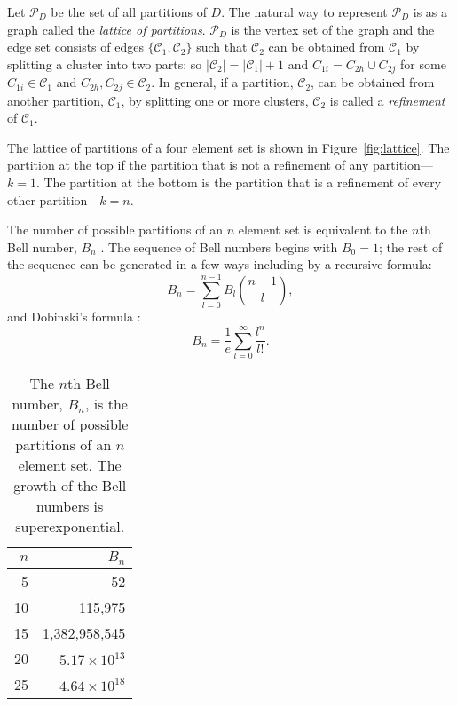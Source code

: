 \documentclass[a4paper]{report}
\newcommand{\dset}{D}
\newcommand{\clus}{\mathcal{C}}
\begin{document}
Let $\mathcal{P}_{D}$ be the set of all partitions of $\dset$.  The natural
way to represent $\mathcal{P}_{D}$ is as a graph called the \textit{lattice of
  partitions}.  $\mathcal{P}_{D}$ is the vertex set of the graph and the edge
set consists of edges $\{\clus_1,\clus_2\}$ such that $\clus_2$ can be
obtained from $\clus_1$ by splitting a cluster into two parts: so $|\clus_2| =
|\clus_1| + 1$ and $C_{1i} = C_{2h} \cup C_{2j}$ for some $C_{1i} \in \clus_1$
and $C_{2h},C_{2j} \in \clus_2$.  In general, if a partition, $\clus_2$, can
be obtained from another partition, $\clus_1$, by splitting one or more
clusters, $\clus_2$ is called a \textit{refinement} of $\clus_1$.

The lattice of partitions of a four element set is shown in
Figure~\ref{fig:lattice}.  The partition at the top if the partition that is
not a refinement of any partition---$k=1$.  The partition at the bottom is the
partition that is a refinement of every other partition---$k=n$.

The number of possible partitions of an $n$ element set is equivalent to the
$n$th Bell number, $B_n$ \citep{bell1934exponential,stanley2000enumerative}.
The sequence of Bell numbers begins with $B_0 = 1$; the rest of the sequence
can be generated in a few ways including by a recursive formula:
\begin{equation*}
  B_n = \sum_{l=0}^{n-1} B_l \binom{n-1}{l},
\end{equation*}
and Dobinski's formula \citep{dobinski1877summation}:
\begin{equation*}
  B_n = \frac{1}{e} \sum_{l=0}^{\infty} \frac{l^n}{l!}.
\end{equation*}

\begin{table}
  \centering
  \begin{tabular}{rr}
    \toprule
    $n$ & $B_n$ \\
    \midrule
    5 & 52 \\
    10 & 115,975 \\
    15 & 1,382,958,545 \\
    20 & $5.17 \times 10^{13}$ \\
    25 & $4.64 \times 10^{18}$ \\
    \bottomrule
  \end{tabular}
  \caption{The $n$th Bell number, $B_n$, is the number of possible partitions
    of an $n$ element set.  The growth of the Bell numbers is
    superexponential.}
  \label{tab:bell-number}
\end{table}
\end{document}
